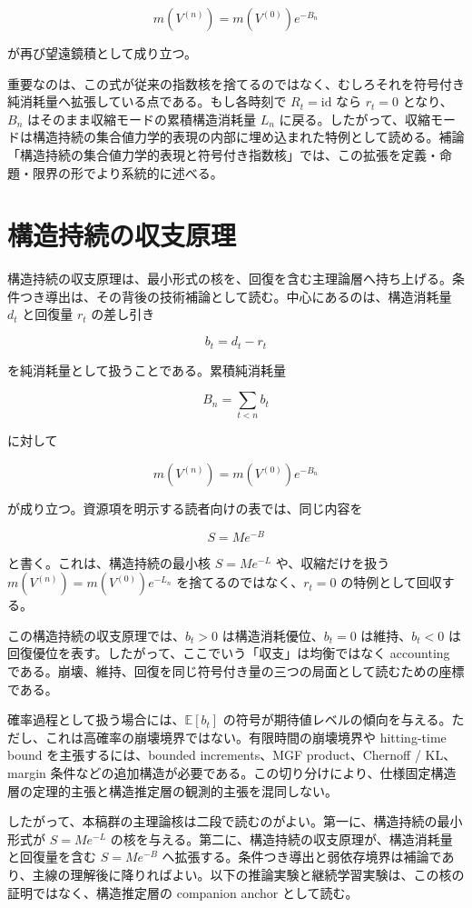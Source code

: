 \documentclass[12pt,a4paper]{article}
\begin{document}
\[
m(V^{(n)}) = m(V^{(0)}) e^{-B_{n}}
\]

が再び望遠鏡積として成り立つ。

重要なのは、この式が従来の指数核を捨てるのではなく、むしろそれを符号付き純消耗量へ拡張している点である。もし各時刻で \(R_{t} = \mathrm{id}\) なら \(r_{t} = 0\) となり、\(B_{n}\) はそのまま収縮モードの累積構造消耗量 \(L_{n}\) に戻る。したがって、収縮モードは構造持続の集合値力学的表現の内部に埋め込まれた特例として読める。補論「構造持続の集合値力学的表現と符号付き指数核」では、この拡張を定義・命題・限界の形でより系統的に述べる。

\section{構造持続の収支原理}\label{ux69cbux9020ux6301ux7d9aux306eux53ceux652fux539fux7406}

構造持続の収支原理は、最小形式の核を、回復を含む主理論層へ持ち上げる。条件つき導出は、その背後の技術補論として読む。中心にあるのは、構造消耗量 \(d_{t}\) と回復量 \(r_{t}\) の差し引き

\[
b_{t} = d_{t} - r_{t}
\]

を純消耗量として扱うことである。累積純消耗量

\[
B_{n} = \sum_{t<n} b_{t}
\]

に対して

\[
m(V^{(n)}) = m(V^{(0)}) e^{-B_{n}}
\]

が成り立つ。資源項を明示する読者向けの表では、同じ内容を

\[
S = M e^{-B}
\]

と書く。これは、構造持続の最小核 \(S=Me^{-L}\) や、収縮だけを扱う \(m(V^{(n)})=m(V^{(0)})e^{-L_{n}}\) を捨てるのではなく、\(r_{t}=0\) の特例として回収する。

この構造持続の収支原理では、\(b_{t}>0\) は構造消耗優位、\(b_{t}=0\) は維持、\(b_{t}<0\) は回復優位を表す。したがって、ここでいう「収支」は均衡ではなく accounting である。崩壊、維持、回復を同じ符号付き量の三つの局面として読むための座標である。

確率過程として扱う場合には、\(\mathbb E[b_{t}]\) の符号が期待値レベルの傾向を与える。ただし、これは高確率の崩壊境界ではない。有限時間の崩壊境界や hitting-time bound を主張するには、bounded increments、MGF product、Chernoff / KL、margin 条件などの追加構造が必要である。この切り分けにより、仕様固定構造層の定理的主張と構造推定層の観測的主張を混同しない。

したがって、本稿群の主理論核は二段で読むのがよい。第一に、構造持続の最小形式が \(S=Me^{-L}\) の核を与える。第二に、構造持続の収支原理が、構造消耗量と回復量を含む \(S=Me^{-B}\) へ拡張する。条件つき導出と弱依存境界は補論であり、主線の理解後に降りればよい。以下の推論実験と継続学習実験は、この核の証明ではなく、構造推定層の companion anchor として読む。
\end{document}
